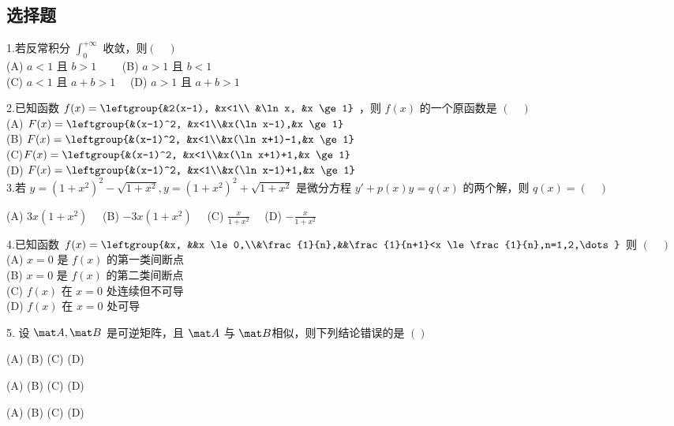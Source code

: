 
\subsection{选择题}
1.若反常积分 $\int_{0}^{+\infty}$ 收敛，则$(\quad)$\\
(A) $a<1$ 且 $b>1 \qquad$
(B) $a>1$ 且 $b<1$\\
(C) $a<1$ 且 $a+b>1 \quad$
(D) $a>1$ 且 $a+b>1$

 2.已知函数 $f(x)=\leftgroup{&2(x-1), &x<1\\ &\ln x, &x \ge 1}$ ，则 $f(x)$ 的一个原函数是  $(\quad)$\\
(A) $F(x)=\leftgroup{&(x-1)^2, &x<1\\&x(\ln x-1),&x \ge 1}$\\
(B) $F(x)=\leftgroup{&(x-1)^2, &x<1\\&x(\ln x+1)-1,&x \ge 1}$\\
(C)$F(x)=\leftgroup{&(x-1)^2, &x<1\\&x(\ln x+1)+1,&x \ge 1}$\\
(D) $F(x)=\leftgroup{&(x-1)^2, &x<1\\&x(\ln x-1)+1,&x \ge 1}$\\

3.若  $y=(1+x^2)^2-\sqrt{1+x^2},y=(1+x^2)^2+\sqrt{1+x^2}$  是微分方程 $y'+p(x)y=q(x)$  的两个解，则 $q(x)= (\quad)$

(A) $3x(1+x^2) \quad$
(B) $-3x(1+x^2) \quad$
(C) $\displaystyle \frac{x}{1+x^2} \quad$
(D) $\displaystyle -\frac{x}{1+x^2} \quad$

4.已知函数 $f(x)=\leftgroup{&x, &&x \le 0,\\&\frac{1}{n},&&\frac{1}{n+1}<x \le \frac{1}{n},n=1,2,\dots}$  则 $(\quad)$\\
(A) $x=0$ 是 $f(x)$  的第一类间断点\\
(B) $x=0$ 是 $f(x)$  的第二类间断点\\
(C) $f(x)$ 在 $x=0$ 处连续但不可导\\
(D) $f(x)$ 在 $x=0$ 处可导

5. 设 $\mat A,\mat B$  是可逆矩阵，且 $\mat A$ 与 $\mat B$相似，则下列结论错误的是 $()$



(A)
(B)
(C)
(D) 



(A)
(B)
(C)
(D) 


(A)
(B)
(C)
(D) 




